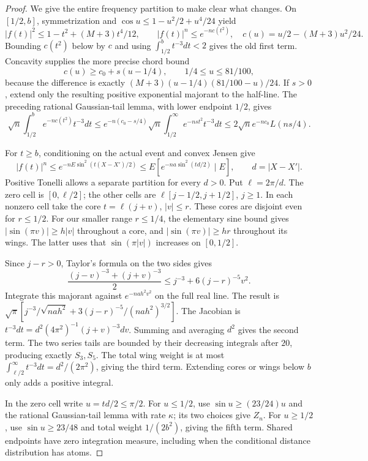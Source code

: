 \begin{proof}
We give the entire frequency partition to make clear what changes.
On $[1/2,b]$, symmetrization and
$\cos u\le1-u^2/2+u^4/24$ yield
\[
 |f(t)|^2\le1-t^2+(M+3)t^4/12,
 \qquad |f(t)|^n\le e^{-n c(t^2)},
 \quad c(u)=u/2-(M+3)u^2/24.
\]
Bounding $c(t^2)$ below by $c$ and using
$\int_{1/2}^{b}t^{-3}dt<2$ gives the old first term.
Concavity supplies the more precise chord bound
\[
 c(u)\ge c_0+s(u-1/4),\qquad 1/4\le u\le81/100,
\]
because the difference is exactly
$(M+3)(u-1/4)(81/100-u)/24$. If $s>0$, extend only the resulting
positive exponential majorant to the half-line. The preceding rational
Gaussian-tail lemma, with lower endpoint $1/2$, gives
\[
 \sqrt n\int_{1/2}^{b}e^{-nc(t^2)}t^{-3}dt
 \le e^{-n(c_0-s/4)}\sqrt n
       \int_{1/2}^{\infty}e^{-ns t^2}t^{-3}dt
 \le2\sqrt n e^{-nc_0}L(ns/4).
\]

For $t\ge b$, conditioning on the actual event and convex Jensen give
\[
 |f(t)|^n\le e^{-nE\sin^2(t(X-X')/2)}
 \le E[e^{-na\sin^2(td/2)}\mid E],\qquad d=|X-X'|.
\]
Positive Tonelli allows a separate partition for every $d>0$.
Put $\ell=2\pi/d$. The zero cell is $[0,\ell/2]$; the other cells are
$\ell[j-1/2,j+1/2]$, $j\ge1$. In each nonzero cell take the core
$t=\ell(j+v)$, $|v|\le r$. These cores are disjoint even for $r\le1/2$.
For our smaller range $r\le1/4$, the elementary sine bound gives
$|\sin(\pi v)|\ge h|v|$ throughout a core, and
$|\sin(\pi v)|\ge hr$ throughout its wings. The latter uses that
$\sin(\pi|v|)$ increases on $[0,1/2]$.

Since $j-r>0$, Taylor's formula on the two sides gives
\[
 \frac{(j-v)^{-3}+(j+v)^{-3}}2
 \le j^{-3}+6(j-r)^{-5}v^2.
\]
Integrate this majorant against $e^{-nah^2v^2}$ on the full real line.
The result is
$\sqrt\pi[j^{-3}/\sqrt{nah^2}
  +3(j-r)^{-5}/(nah^2)^{3/2}]$.
The Jacobian is
$t^{-3}dt=d^2(4\pi^2)^{-1}(j+v)^{-3}dv$.
Summing and averaging $d^2$ gives the second term. The two series tails
are bounded by their decreasing integrals after $20$, producing exactly
$S_3,S_5$. The total wing weight is at most
$\int_{\ell/2}^{\infty}t^{-3}dt=d^2/(2\pi^2)$, giving the third term.
Extending cores or wings below $b$ only adds a positive integral.

In the zero cell write $u=td/2\le\pi/2$.
For $u\le1/2$, use $\sin u\ge(23/24)u$ and the rational
Gaussian-tail lemma with rate $\kappa$; its two choices give $Z_n$.
For $u\ge1/2$, use $\sin u\ge23/48$ and total weight
$1/(2b^2)$, giving the fifth term. Shared endpoints have zero integration
measure, including when the conditional distance distribution has atoms.


\end{proof}
